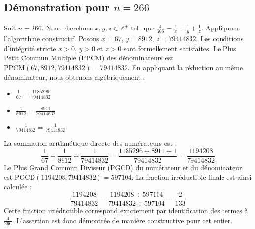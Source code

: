 \documentclass[11pt,a4paper]{article}
\begin{document}
\subsection{Démonstration pour $n = 266$}
Soit $n = 266$. Nous cherchons $x, y, z \in \mathbb{Z}^{+}$ tels que $\frac{4}{266} = \frac{1}{x} + \frac{1}{y} + \frac{1}{z}$.
Appliquons l'algorithme constructif. Posons $x = 67$, $y = 8912$, $z = 79414832$.
Les conditions d'intégrité stricte $x > 0$, $y > 0$ et $z > 0$ sont formellement satisfaites.
Le Plus Petit Commun Multiple (PPCM) des dénominateurs est $\text{PPCM}(67, 8912, 79414832) = 79414832$.
En appliquant la réduction au même dénominateur, nous obtenons algébriquement :
\begin{itemize}
    \item $\frac{1}{67} = \frac{1185296}{79414832}$
    \item $\frac{1}{8912} = \frac{8911}{79414832}$
    \item $\frac{1}{79414832} = \frac{1}{79414832}$
\end{itemize}
La sommation arithmétique directe des numérateurs est :
$$ \frac{1}{67} + \frac{1}{8912} + \frac{1}{79414832} = \frac{1185296 + 8911 + 1}{79414832} = \frac{1194208}{79414832} $$
Le Plus Grand Commun Diviseur (PGCD) du numérateur et du dénominateur est $\text{PGCD}(1194208, 79414832) = 597104$.
La fraction irréductible finale est ainsi calculée :
$$ \frac{1194208}{79414832} = \frac{1194208 \div 597104}{79414832 \div 597104} = \frac{2}{133} $$
Cette fraction irréductible correspond exactement par identification des termes à $\frac{4}{266}$. L'assertion est donc démontrée de manière constructive pour cet entier.
\end{document}
